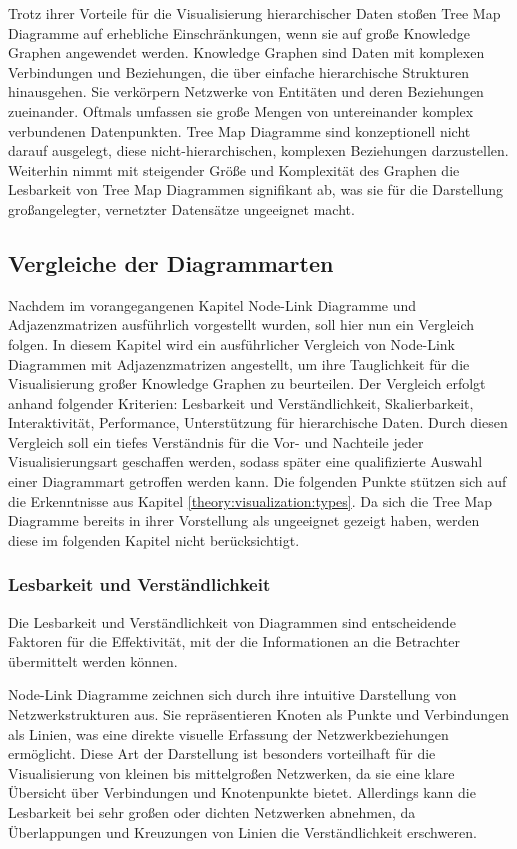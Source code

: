 Trotz ihrer Vorteile für die Visualisierung hierarchischer Daten stoßen Tree Map Diagramme auf erhebliche Einschränkungen, wenn sie auf große Knowledge Graphen angewendet werden. Knowledge Graphen sind Daten mit komplexen Verbindungen und Beziehungen, die über einfache hierarchische Strukturen hinausgehen. Sie verkörpern Netzwerke von Entitäten und deren Beziehungen zueinander. Oftmals umfassen sie große Mengen von untereinander komplex verbundenen Datenpunkten. Tree Map Diagramme sind konzeptionell nicht darauf ausgelegt, diese nicht-hierarchischen, komplexen Beziehungen darzustellen. Weiterhin nimmt mit steigender Größe und Komplexität des Graphen die Lesbarkeit von Tree Map Diagrammen signifikant ab, was sie für die Darstellung großangelegter, vernetzter Datensätze ungeeignet macht.

\subsection{Vergleiche der Diagrammarten}

Nachdem im vorangegangenen Kapitel Node-Link Diagramme und Adjazenzmatrizen ausführlich vorgestellt wurden, soll hier nun ein Vergleich folgen. In diesem Kapitel wird ein ausführlicher Vergleich von Node-Link Diagrammen mit Adjazenzmatrizen angestellt, um ihre Tauglichkeit für die Visualisierung großer Knowledge Graphen zu beurteilen. Der Vergleich erfolgt anhand folgender Kriterien: Lesbarkeit und Verständlichkeit, Skalierbarkeit, Interaktivität, Performance, Unterstützung für hierarchische Daten. Durch diesen Vergleich soll ein tiefes Verständnis für die Vor- und Nachteile jeder Visualisierungsart geschaffen werden, sodass später eine qualifizierte Auswahl einer Diagrammart getroffen werden kann. Die folgenden Punkte stützen sich auf die Erkenntnisse aus Kapitel \ref{theory:visualization:types}. Da sich die Tree Map Diagramme bereits in ihrer Vorstellung als ungeeignet gezeigt haben, werden diese im folgenden Kapitel nicht berücksichtigt.

\subsubsection{Lesbarkeit und Verständlichkeit}
\label{theory:visualization:comparison:readability}

Die Lesbarkeit und Verständlichkeit von Diagrammen sind entscheidende Faktoren für die Effektivität, mit der die Informationen an die Betrachter übermittelt werden können.

Node-Link Diagramme zeichnen sich durch ihre intuitive Darstellung von Netzwerkstrukturen aus. Sie repräsentieren Knoten als Punkte und Verbindungen als Linien, was eine direkte visuelle Erfassung der Netzwerkbeziehungen ermöglicht. Diese Art der Darstellung ist besonders vorteilhaft für die Visualisierung von kleinen bis mittelgroßen Netzwerken, da sie eine klare Übersicht über Verbindungen und Knotenpunkte bietet. Allerdings kann die Lesbarkeit bei sehr großen oder dichten Netzwerken abnehmen, da Überlappungen und Kreuzungen von Linien die Verständlichkeit erschweren.


